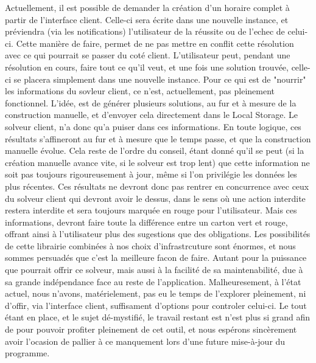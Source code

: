 Actuellement, il est possible de demander la création d'un horaire complet à partir de l'interface client. Celle-ci sera écrite dans une nouvelle instance, et préviendra (via les notifications) l'utilisateur de la réussite ou de l'echec de celui-ci.  Cette manière de faire, permet de ne pas mettre en conflit cette résolution avec ce qui pourrait se passer du coté client. L'utilisateur peut, pendant une résolution en cours, faire tout ce qu'il veut, et une fois une solution trouvée, celle-ci se placera simplement dans une nouvelle instance.
Pour ce qui est de "nourrir" les informations du sovleur client, ce n'est, actuellement, pas pleinement fonctionnel. L'idée, est de générer plusieurs solutions, 
au fur et à mesure de la construction manuelle, et d'envoyer cela directement dans le Local Storage. Le solveur client, n'a donc qu'a puiser dans ces informations.
En toute logique, ces résultats s'affineront au fur et à mesure que le temps passe, et que la construction manuelle évolue. Cela reste de l'ordre du conseil, étant donné qu'il se peut (si la création manuelle avance vite, si le solveur est trop lent) que cette information ne soit pas toujours rigoureusement à jour, même si l'on privilégie les données les plus récentes.  Ces résultats ne devront donc pas rentrer en concurrence avec ceux du solveur client qui devront avoir le dessus, dans le sens où une action interdite restera interdite et sera toujours marquée en rouge pour l'utilisateur. 
Mais ces informations, devront faire toute la différence entre un carton vert et rouge, offrant ainsi à l'utilisateur plus des sugestions que des obligations. 
\newline
\indent
Les possibilités de cette librairie combinées à nos choix d'infrastrcuture sont énormes, et nous sommes persuadés que c'est la meilleure facon de faire. Autant pour la puissance que pourrait offrir ce solveur, mais aussi à la facilité de sa maintenabilité, due à sa grande indépendance face au reste de l'application.
Malheuresement, à l'état actuel, nous n'avons, matérielement, pas eu le temps de l'explorer pleinement, ni d'offir, via l'interface client, suffisament d'options pour controler celui-ci.
Le tout étant en place, et le sujet dé-mystifié, le travail restant est n'est plus si grand afin de pour pouvoir profiter pleinement de cet outil, et nous espérons sincèrement avoir l'ocasion de pallier à ce manquement lors d'une future mise-à-jour du programme.
